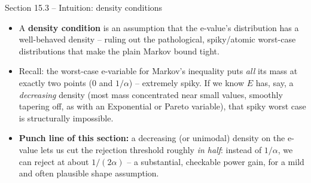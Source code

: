 \documentclass[aspectratio=169,10pt]{beamer}
\begin{document}
\begin{frame}{Section 15.3 -- Intuition: density conditions}
  \begin{itemize}
    \item A \textbf{density condition} is an assumption that the e-value's distribution has a well-behaved density -- ruling out the pathological, spiky/atomic worst-case distributions that make the plain Markov bound tight.
    \item Recall: the worst-case e-variable for Markov's inequality puts \emph{all} its mass at exactly two points ($0$ and $1/\alpha$) -- extremely spiky. If we know $E$ has, say, a \emph{decreasing} density (most mass concentrated near small values, smoothly tapering off, as with an Exponential or Pareto variable), that spiky worst case is structurally impossible.
    \item \textbf{Punch line of this section:} a decreasing (or unimodal) density on the e-value lets us cut the rejection threshold roughly \emph{in half}: instead of $1/\alpha$, we can reject at about $1/(2\alpha)$ -- a substantial, checkable power gain, for a mild and often plausible shape assumption.
  \end{itemize}
\end{frame}
\end{document}
